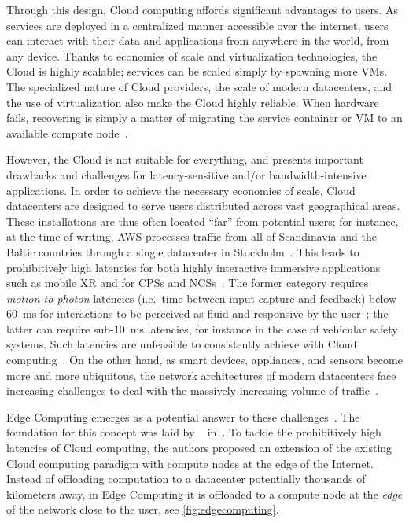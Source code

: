 Through this design, Cloud computing affords significant advantages to users.
As services are deployed in a centralized manner accessible over the internet, users can interact with their data and applications from anywhere in the world, from any device.
Thanks to economies of scale and virtualization technologies, the Cloud is highly scalable;
services can be scaled simply by spawning more \glspl{VM}.
The specialized nature of Cloud providers, the scale of modern datacenters, and the use of virtualization also make the Cloud highly reliable.
When hardware fails, recovering is simply a matter of migrating the service container or \gls{VM} to an available compute node~\cite{endo2016high}.

However, the Cloud is not suitable for everything, and presents important drawbacks and challenges for latency-sensitive and/or bandwidth-intensive applications.
In order to achieve the necessary economies of scale, Cloud datacenters are designed to serve users distributed across vast geographical areas.
These installations are thus often located ``far'' from potential users;
for instance, at the time of writing, \gls{AWS} processes traffic from all of Scandinavia and the Baltic countries through a single datacenter in Stockholm~\cite{awsregions}.
This leads to prohibitively high latencies for both highly interactive immersive applications such as mobile \gls{XR} and for \glspl{CPS} and \glspl{NCS}~\cite{tolia2006quantifying,lagar2007interactive,satyanarayanan2009case,varghese2016challenges,shi2016promise}.
The former category requires \emph{motion-to-photon} latencies (i.e.\ time between input capture and feedback) below \SI{60}{\milli\second} for interactions to be perceived as fluid and responsive by the user~\cite{chen2017empirical}; the latter can require sub-\SI{10}{\milli\second} latencies, for instance in the case of vehicular safety systems.
Such latencies are unfeasible to consistently achieve with Cloud computing~\cite{dang2021cloudy}.
On the other hand, as smart devices, appliances, and sensors become more and more ubiquitous, the network architectures of modern datacenters face increasing challenges to deal with the massively increasing volume of traffic~\cite{shi2016edge,wang2019towards}.

\medskip
Edge Computing emerges as a potential answer to these challenges~\cite{satyanarayanan2009case,shi2016promise,shi2016edge,varghese2016challenges,satyanarayanan2017emergence,bittmann2017edge,wang2019towards}.
The foundation for this concept was laid by \citeauthor{satyanarayanan2009case}~\cite{satyanarayanan2009case} in\ \citeyear{satyanarayanan2009case}.
To tackle the prohibitively high latencies of Cloud computing, the authors proposed an extension of the existing Cloud computing paradigm with compute nodes at the edge of the Internet.
Instead of offloading computation to a datacenter potentially thousands of kilometers away, in Edge Computing it is offloaded to a compute node at the \emph{edge} of the network close to the user, see \cref{fig:edgecomputing}.

